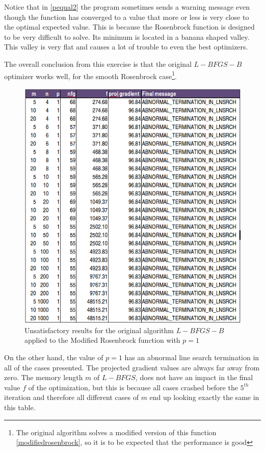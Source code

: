 Notice that in \ref{pequal2} the program sometimes sends a warning message even though the function has converged to a value that more or less is very close to the optimal expected value.  This is because the Rosenbrock function is designed to be very difficult to solve.  Its minimum is located in a banana shaped valley. This valley is very flat and causes a lot of trouble to even the best optimizers.

The overall conclusion from this exercise is that the original $L-BFGS-B$ optimizer works well, for the smooth Rosenbrock case\footnote{The original algorithm solves a modified version of this function \ref{modifiedrosenbrock}, so it is to be expected that the performance is good}.

\begin{figure}
\begin{center}
\includegraphics[scale=0.75]{Figures/abnormalNocedal.png}
\caption[Modified Rosenbrock with $p = 1$]{Unsatisfactory results for the original algorithm $L-BFGS-B$ applied to the Modified Rosenbrock function with $p = 1$}
\label{pequal1}
\end{center}
\end{figure}

On the other hand, the value of $p = 1$ has an abnormal line search termination in all of the cases presented. The projected gradient values are always far away from zero. The memory length $m$ of $L-BFGS$, does not have an impact in the final value $f$ of the optimization, but this is because all cases crashed before the $5^{th}$ iteration and therefore all different cases of $m$ end up looking exactly the same in this table.

